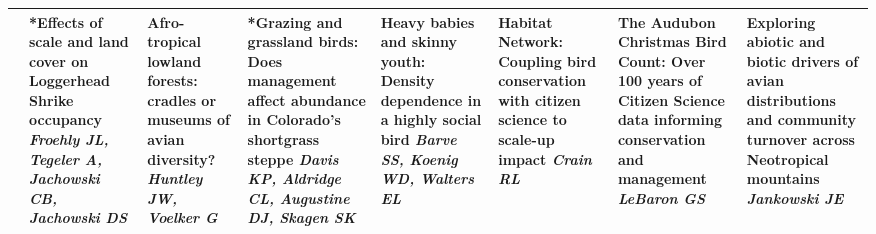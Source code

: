 \begin{tabular}{|x{0.85cm}|x{2.85cm}|x{2.85cm}|x{2.85cm}|x{2.85cm}|a{2.85cm}|a{2.85cm}|a{2.85cm}|}
&*Effects of scale and land cover on Loggerhead Shrike occupancy \newline \newline \textit{Froehly JL, Tegeler A, Jachowski CB, Jachowski DS} & Afro-tropical lowland forests: cradles or museums of avian diversity? \newline \newline \textit{Huntley JW, Voelker G} & *Grazing and grassland birds: Does management affect abundance in Colorado's shortgrass steppe \newline \newline \textit{Davis KP, Aldridge CL, Augustine DJ, Skagen SK} & Heavy babies and skinny youth: Density dependence in a highly social bird \newline \newline \textit{Barve SS, Koenig WD, Walters EL} & Habitat Network: Coupling bird conservation with citizen science to scale-up impact \newline \newline \textit{Crain RL} & The Audubon Christmas Bird Count: Over 100 years of Citizen Science data informing conservation and management \newline \newline \textit{LeBaron GS} & Exploring abiotic and biotic drivers of avian distributions and community turnover across Neotropical mountains \newline \newline \textit{Jankowski JE}\\
\hline

\end{tabular}
